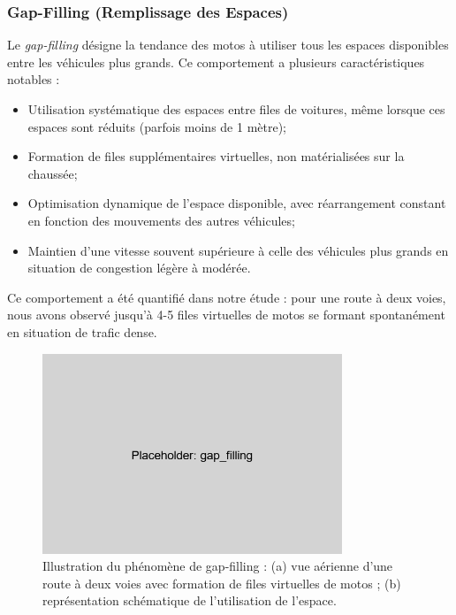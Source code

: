 \subsubsection{Gap-Filling (Remplissage des Espaces)}
\label{subsubsec:gap_filling}

Le \textit{gap-filling} désigne la tendance des motos à utiliser tous les espaces disponibles entre les véhicules plus grands. Ce comportement a plusieurs caractéristiques notables :

\begin{itemize}
\item Utilisation systématique des espaces entre files de voitures, même lorsque ces espaces sont réduits (parfois moins de 1 mètre);
\item Formation de files supplémentaires virtuelles, non matérialisées sur la chaussée;
\item Optimisation dynamique de l'espace disponible, avec réarrangement constant en fonction des mouvements des autres véhicules;
\item Maintien d'une vitesse souvent supérieure à celle des véhicules plus grands en situation de congestion légère à modérée.
\end{itemize}

Ce comportement a été quantifié dans notre étude : pour une route à deux voies, nous avons observé jusqu'à 4-5 files virtuelles de motos se formant spontanément en situation de trafic dense.

\begin{figure}[htbp]
\centering
\includegraphics[width=0.8\textwidth]{images/specificites_benin/gap_filling}
\caption{Illustration du phénomène de gap-filling : (a) vue aérienne d'une route à deux voies avec formation de files virtuelles de motos ; (b) représentation schématique de l'utilisation de l'espace.}
\label{fig:gap_filling}
\end{figure}

